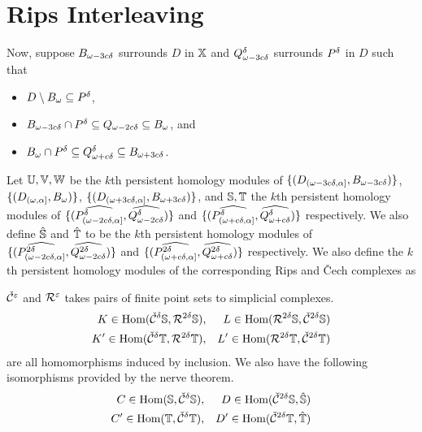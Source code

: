 
\section{Rips Interleaving}

Now, suppose $B_{\omega -3c\of}$ surrounds $D$ in $\X$ and $Q_{\omega-3c\of}^\of$ surrounds $\P$ in $D$ such that

\begin{itemize}
  \item $D\setminus \B\subseteq \P$,
  \item $B_{\omega -3c\of}\cap \P \subseteq Q_{\omega-2c\of}\subseteq \B$, and
  \item $\B\cap \P\subseteq \QQ^\of\subseteq B_{\omega+3c\of}$.
\end{itemize}

Let $\U, \V, \W$ be the $k$th persistent homology modules of $\{(D\subi{\omega-3c\of, \alpha}, B_{\omega-3c\of})\}$, $\{(D\subi{\omega,\alpha}, \B)\}$, $\{(D\subi{\omega+3c\of,\alpha}, B_{\omega+3c\of})\}$, and $\S, \T$ the $k$th persistent homology modules of $\{(\ext{\P\subi{\omega-2c\of,\alpha}},\ext{Q_{\omega-2c\of}^\of})\}$ and $\{(\ext{\P\subi{\omega+c\of,\alpha}},\ext{\QQ^\of})\}$ respectively.
We also define $\hat{\S}$ and $\hat{\T}$ to be the $k$th persistent homology modules of $\{(\ext{P^{2\delta}\subi{\omega-2c\of,\alpha}},\ext{Q_{\omega-2c\of}^{2\of}})\}$ and $\{(\ext{P^{2\of}\subi{\omega+c\of,\alpha}},\ext{\QQ^{2\of}})\}$ respectively.
We also define the $k$th persistent homology modules of the corresponding Rips and \v{C}ech complexes as

$\cech^\e$ and $\rips^\e$ takes pairs of finite point sets to simplicial complexes.
\begin{align*}
  K \in\Hom(\cech^\delta\S, \rips^{2\delta}\S),&& L \in \Hom(\rips^{2\delta}\S, \cech^{2\delta}\S)\\
  K'\in\Hom(\cech^\delta\T, \rips^{2\delta}\T),&& L' \in\Hom(\rips^{2\delta}\T, \cech^{2\delta}\T)
\end{align*}
are all homomorphisms induced by inclusion.
We also have the following isomorphisms provided by the nerve theorem.
\begin{align*}
  C \in\Hom(\S,\cech^\of\S),&& D \in\Hom(\cech^{2\of}\S,\hat{\S})\\
  C'\in \Hom(\T,\cech^\of\T),&& D'\in \Hom(\cech^{2\of}\T,\hat{\T})
\end{align*}

